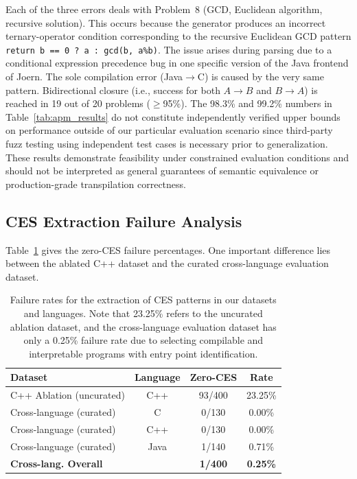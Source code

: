 Each of the three errors deals with Problem~8 (GCD, Euclidean algorithm, recursive solution). This occurs because the generator produces an incorrect ternary-operator condition corresponding to the recursive Euclidean GCD pattern \texttt{return b == 0 ? a : gcd(b, a\%b)}. The issue arises during parsing due to a conditional expression precedence bug in one specific version of the Java frontend of Joern. The sole compilation error (Java$\rightarrow$C) is caused by the very same pattern. Bidirectional closure (i.e., success for both $A\rightarrow B$ and $B\rightarrow A$) is reached in 19 out of 20 problems ($\geq$95\%). The 98.3\% and 99.2\% numbers in Table~\ref{tab:apm_results} do not constitute independently verified upper bounds on performance outside of our particular evaluation scenario since third-party fuzz testing using independent test cases is necessary prior to generalization. These results demonstrate feasibility under constrained evaluation conditions and should not be interpreted as general guarantees of semantic equivalence or production-grade transpilation correctness.

\subsection{CES Extraction Failure Analysis}
\label{subsec:error_analysis}

Table~\ref{tab:ces_failure} gives the zero-CES failure percentages. One important difference lies between the ablated C++ dataset and the curated cross-language evaluation dataset.

\begin{table}[ht]
\caption{Failure rates for the extraction of CES patterns in our datasets and languages. Note that 23.25\% refers to the uncurated ablation dataset, and the cross-language evaluation dataset has only a 0.25\% failure rate due to selecting compilable and interpretable programs with entry point identification.}
\label{tab:ces_failure}
\centering
\begin{tabular}{|l|c|c|c|}
\hline
\textbf{Dataset} & \textbf{Language} & \textbf{Zero-CES} & \textbf{Rate} \\
\hline
C++ Ablation (uncurated) & C++ & 93/400 & 23.25\% \\
\hline
Cross-language (curated) & C   & 0/130  & 0.00\% \\
Cross-language (curated) & C++ & 0/130  & 0.00\% \\
Cross-language (curated) & Java& 1/140  & 0.71\% \\
\textbf{Cross-lang. Overall} & & \textbf{1/400} & \textbf{0.25\%} \\
\hline
\end{tabular}
\end{table}

